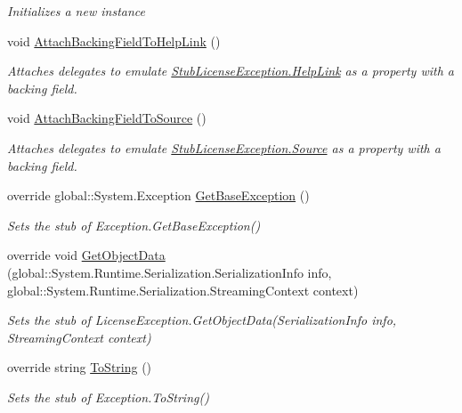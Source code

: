 \begin{DoxyCompactItemize}
\begin{DoxyCompactList}\small\item\em Initializes a new instance\end{DoxyCompactList}\item 
void \hyperlink{class_system_1_1_component_model_1_1_fakes_1_1_stub_license_exception_ab84acd3efd3a05c8b3e38351fee3edd0}{Attach\-Backing\-Field\-To\-Help\-Link} ()
\begin{DoxyCompactList}\small\item\em Attaches delegates to emulate \hyperlink{class_system_1_1_component_model_1_1_fakes_1_1_stub_license_exception_a215f5134b5c15d749681b6eef6d59275}{Stub\-License\-Exception.\-Help\-Link} as a property with a backing field.\end{DoxyCompactList}\item 
void \hyperlink{class_system_1_1_component_model_1_1_fakes_1_1_stub_license_exception_a4a35378a8609619d4abc8dc7fab24ae8}{Attach\-Backing\-Field\-To\-Source} ()
\begin{DoxyCompactList}\small\item\em Attaches delegates to emulate \hyperlink{class_system_1_1_component_model_1_1_fakes_1_1_stub_license_exception_af72178e6ab9dde0a7fa9a663d8cf7f58}{Stub\-License\-Exception.\-Source} as a property with a backing field.\end{DoxyCompactList}\item 
override global\-::\-System.\-Exception \hyperlink{class_system_1_1_component_model_1_1_fakes_1_1_stub_license_exception_af6a6fc5915441a6e49b4fbc5772def38}{Get\-Base\-Exception} ()
\begin{DoxyCompactList}\small\item\em Sets the stub of Exception.\-Get\-Base\-Exception()\end{DoxyCompactList}\item 
override void \hyperlink{class_system_1_1_component_model_1_1_fakes_1_1_stub_license_exception_a1d97b0df8dd252edb4f4e767c3ea5e33}{Get\-Object\-Data} (global\-::\-System.\-Runtime.\-Serialization.\-Serialization\-Info info, global\-::\-System.\-Runtime.\-Serialization.\-Streaming\-Context context)
\begin{DoxyCompactList}\small\item\em Sets the stub of License\-Exception.\-Get\-Object\-Data(\-Serialization\-Info info, Streaming\-Context context)\end{DoxyCompactList}\item 
override string \hyperlink{class_system_1_1_component_model_1_1_fakes_1_1_stub_license_exception_a784d77eab3791a9586f8e4fd6f33db29}{To\-String} ()
\begin{DoxyCompactList}\small\item\em Sets the stub of Exception.\-To\-String()\end{DoxyCompactList}\end{DoxyCompactItemize}
